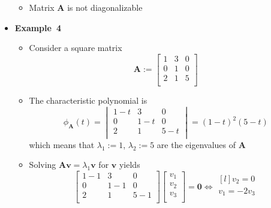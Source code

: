 \documentclass[12pt,a4paper]{article}
\begin{document}
\begin{itemize}
\begin{itemize}
  \item Matrix $\bm{A}$ is not diagonalizable

  \end{itemize}

\item \textbf{Example~4}
  \begin{itemize}
  \item Consider a square matrix
    \begin{equation}\nonumber%
      \bm{A} :=
      \begin{bmatrix}
        1 & 3 & 0 \\
        0 & 1 & 0 \\
        2 & 1 & 5 \\
      \end{bmatrix}
    \end{equation}
  \item The characteristic polynomial is
    \begin{equation}\nonumber%
      \phi_{\bm{A}}(t) =
      \begin{vmatrix}
        1-t & 3 & 0 \\
        0 & 1-t & 0 \\
        2 & 1 & 5-t \\
      \end{vmatrix}
      =
      (1-t)^{2}(5-t)
    \end{equation}
    which means that
    $\lambda_{1}:=1$,
    $\lambda_{2}:=5$
    are the eigenvalues of $\bm{A}$
  \item Solving $\bm{A}\bm{v}=\lambda_{1}\bm{v}$ for $\bm{v}$ yields
    \begin{equation}\nonumber%
      \begin{bmatrix}
        1-1 & 3 & 0 \\
        0 & 1-1 & 0 \\
        2 & 1 & 5-1 \\
      \end{bmatrix}
      \begin{bmatrix}
        v_{1} \\
        v_{2} \\
        v_{3} \\
      \end{bmatrix}
      = \bm{0}
      \iff
      \begin{matrix*}[l]
        v_{2} = 0 \\
        v_{1} = -2v_{3} \\
      \end{matrix*}

\end{equation}
\end{itemize}
\end{itemize}
\end{document}
